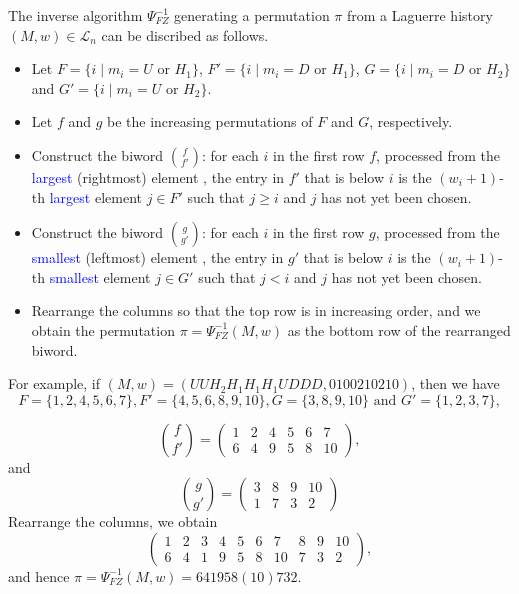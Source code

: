 \documentclass[12pt]{article}
\def\blue{\textcolor{blue}}
\def\blue{\textcolor{blue}}
\numberwithin{equation}{section}
\def\blue{\textcolor{blue}}
\def\blue{\textcolor{blue}}
\theoremstyle{plain}
\def\L{\mathcal{L}}
\begin{document}
    The inverse algorithm   $\Psi_{FZ}^{-1}$ generating a permutation $\pi$  from a Laguerre history $(M,w)\in\L_{n}$  can be discribed as follows.
     \begin{itemize}
     	
     	\item Let $F=\{i\mid m_i=U\,\, \mbox{or}\,\, H_1\}$, $F'=\{i\mid m_i=D \,\, \mbox{or}\,\, H_1\}$, $G=\{i\mid m_i=D\,\, \mbox{or}\,\, H_2\}$ and $G'=\{i\mid m_i=U\,\, \mbox{or}\,\, H_2\}$. 
     	\item Let $f$ and $g$ be the increasing permutations of $F$ and $G$, respectively.
     	
     	\item Construct the biword $\binom{f}{f'}$: for each $i$ in the first row $f$, processed from 
     	the \blue{ largest}  (rightmost) element , the entry in $f'$ that is below  $i$ is the $(w_i+1)$-th \blue{largest } element $j\in F'$ such that $j\geq i$ and $j$ has not yet been chosen.
     	
     	\item Construct the biword $\binom{g}{g'}$: for each $i$ in the first row $g$, processed from the \blue{smallest } (leftmost) element , the entry in $g'$ that is below  $i$ is the $(w_i+1)$-th \blue{smallest} element $j\in G'$ such that $j< i$ and $j$ has not yet been chosen. 
     	
     	\item Rearrange the columns so that the top row is in increasing order, and we obtain the
     	permutation $\pi=\Psi^{-1}_{FZ}(M,w)$ as the bottom row of the rearranged biword.
     \end{itemize}
     
     For example,  if  $(M,w)=(UUH_2H_1H_1H_1UDDD, 0100210210)$, then we have
     $$
     F=\{1,2,4,5,6,7\}, F'=\{4,5,6,8,9,10\}, G=\{3,8,9,10\}\,\, \mbox{and}\,\,  G'=\{1,2,3,7\},
     $$
     
     \[
     \binom{f}{f'}=
     \begin{pmatrix}
     	1 & 2 &  4 & 5 & 6 & 7 \\
     	6 & 4 & 9 & 5 & 8 & 10
     \end{pmatrix}, 
     \]
     and 
     \[
     \binom{g}{g'}=
     \begin{pmatrix}
     	3 &  8 & 9 & 10 \\
     	1 &   7 & 3 & 2
     \end{pmatrix}
     \]
     Rearrange the columns, we obtain
     \[ \begin{pmatrix}
     	1&2&3&4&5&6&7&8&9&10 \\
     	6&4&1&9&5&8&10&7&3&2
     \end{pmatrix},\]
     and hence $\pi=\Psi^{-1}_{FZ}(M,w)=641958(10)732$.
     
\end{document}
